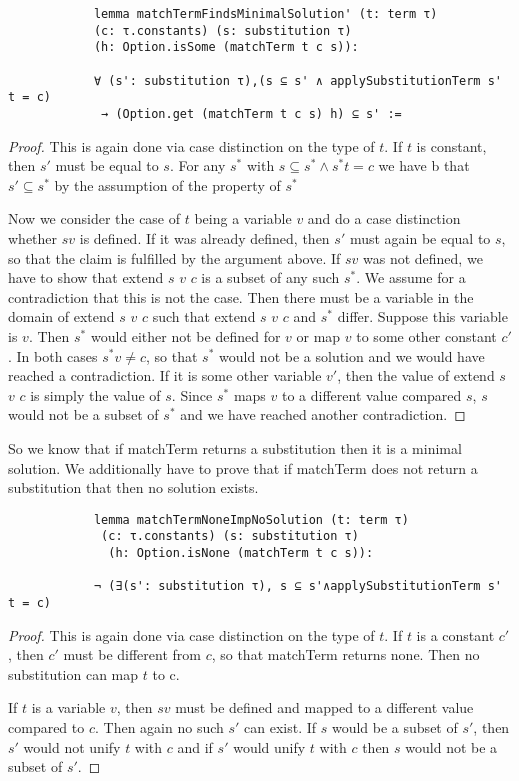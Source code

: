 \documentclass{article}
\begin{document}
        \begin{lstlisting}
            lemma matchTermFindsMinimalSolution' (t: term τ) 
            (c: τ.constants) (s: substitution τ) 
            (h: Option.isSome (matchTerm t c s)): 
            
            ∀ (s': substitution τ),(s ⊆ s' ∧ applySubstitutionTerm s' t = c)
             → (Option.get (matchTerm t c s) h) ⊆ s' :=
        \end{lstlisting}
        \begin{proof}
        This is again done via case distinction on the type of $t$. If $t$ is constant, then $s'$ must be equal to $s$. For any $s^\ast$ with $s \subseteq s^\ast \land s^\ast t = c$ we have b that $s' \subseteq s^\ast$ by the assumption of the property of $s^\ast$

        Now we consider the case of $t$ being a variable $v$ and do a case distinction whether $s v$ is defined. If it was already defined, then $s'$ must again be equal to $s$, so that the claim is fulfilled by the argument above.
        If $s v$ was not defined, we have to show that extend $s$ $v$ $c$ is a subset of any such $s^\ast$. We assume for a contradiction that this is not the case. Then there must be a variable in the domain of extend $s$ $v$ $c$ such that extend $s$ $v$ $c$ and $s^\ast$ differ. Suppose this variable is $v$. Then $s^\ast$ would either not be defined for $v$ or map $v$ to some other constant $c'$. In both cases $s^\ast v \neq c$, so that $s^\ast$ would not be a solution and we would have reached a contradiction.
        If it is some other variable $v'$, then the value of extend $s$ $v$ $c$ is simply the value of $s$. Since $s^\ast$ maps $v$ to a different value compared $s$, $s$ would not be a subset of $s^\ast$ and we have reached another contradiction.
        \end{proof}

        So we know that if matchTerm returns a substitution then it is a minimal solution. We additionally have to prove that if matchTerm does not return a substitution that then no solution exists.

        \begin{lstlisting}
            lemma matchTermNoneImpNoSolution (t: term τ)
             (c: τ.constants) (s: substitution τ)
              (h: Option.isNone (matchTerm t c s)):
            
            ¬ (∃(s': substitution τ), s ⊆ s'∧applySubstitutionTerm s' t = c)
        \end{lstlisting}
        \begin{proof}
        This is again done via case distinction on the type of $t$. If $t$ is a constant $c'$, then $c'$ must be different from $c$, so that matchTerm returns none. Then no substitution can map $t$ to c.

        If $t$ is a variable $v$, then $s v$ must be defined and mapped to a different value compared to $c$. Then again no such $s'$ can exist. If $s$ would be a subset of $s'$, then $s'$ would not unify $t$ with $c$ and if $s'$ would unify $t$ with $c$ then $s$ would not be a subset of $s'$.
        \end{proof}
\end{document}
